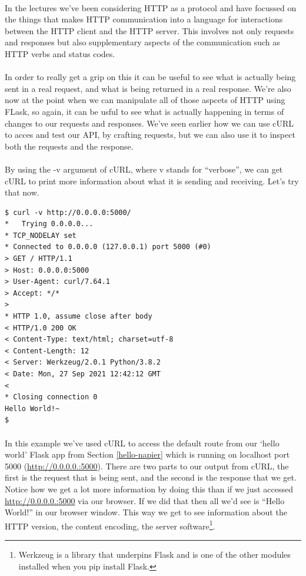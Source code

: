 \documentclass[12pt, a4paper, oneside]{book}
\begin{document}
\paragraph{} In the lectures we've been considering HTTP as a protocol and have focussed on the things that makes HTTP communication into a language for interactions between the HTTP client and the HTTP server. This involves not only requests and responses but also supplementary aspects of the communication such as HTTP verbs and status codes. 

\paragraph{} In order to really get a grip on this it can be useful to see what is actually being sent in a real request, and what is being returned in a real response. We're also now at the point when we can manipulate all of those aspcets of HTTP using FLask, so again, it can be usful to see what is actually happening in terms of changes to our requests and responses. We've seen earlier how we can use cURL to acces and test our API, by crafting requests, but we can also use it to inspect both the requests and the response.

\paragraph{} By using the -v argument of cURL, where v stands for ``verbose'', we can get cURL to print more information about what it is sending and receiving. Let's try that now.

\begin{lstlisting}[style=DOS]
$ curl -v http://0.0.0.0:5000/
*   Trying 0.0.0.0...
* TCP_NODELAY set
* Connected to 0.0.0.0 (127.0.0.1) port 5000 (#0)
> GET / HTTP/1.1
> Host: 0.0.0.0:5000
> User-Agent: curl/7.64.1
> Accept: */*
> 
* HTTP 1.0, assume close after body
< HTTP/1.0 200 OK
< Content-Type: text/html; charset=utf-8
< Content-Length: 12
< Server: Werkzeug/2.0.1 Python/3.8.2
< Date: Mon, 27 Sep 2021 12:42:12 GMT
< 
* Closing connection 0
Hello World!~
$ 
\end{lstlisting}

\paragraph{} In this example we've used cURL to access the default route from our `hello world' Flask app from Section \ref{hello-napier} which is running on localhost port 5000 (\url{http://0.0.0.0.:5000}). There are two parts to our output from cURL, the first is the request that is being sent, and the second is the response that we get. Notice how we get a lot more information by doing this than if we just accessed \url{http://0.0.0.0.:5000} via our browser. If we did that then all we'd see is ``Hello World!'' in our browser window. This way we get to see information about the HTTP version, the content encoding, the server software\footnote{Werkzeug is a library that underpins Flask and is one of the other modules installed when you pip install Flask.}.
\end{document}
